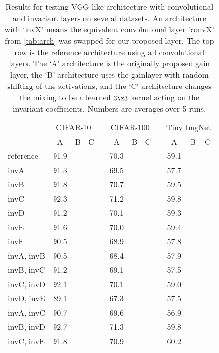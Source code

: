 \begin{table}
  \renewcommand{\arraystretch}{1.2}
  \centering
  \caption{Results for testing VGG like architecture with convolutional and
  invariant layers on several datasets. An architecture with `invX' means the
  equivalent convolutional layer `convX' from \autoref{tab:arch} was swapped for
  our proposed layer. The top row is the reference architecture using all
  convolutional layers. The `A' architecture is the originally proposed gain
  layer, the `B' architecture uses the gainlayer with random shifting of the
  activations, and the `C' architecture changes the mixing to be a learned
  $3\x3$ kernel acting on the invariant coefficients. Numbers are averages over
  5 runs.}
  \begin{tabular}{@{}lccclccclccc@{}}
    \toprule
    & \multicolumn{3}{c}{CIFAR-10} & \phantom{abc} & \multicolumn{3}{c}{CIFAR-100} & \phantom{abc} & \multicolumn{3}{c}{Tiny ImgNet} \\ \cline{2-4}\cline{6-8}\cline{10-12}
    \phantom{abc} & A  & B & C &&  A & B & C && A & B & C \\ \midrule
    reference & 91.9 & - & - && 70.3 & - & - && 59.1 & - & - \\ \midrule
    invA & 91.3 & & && 69.5 & & && 57.7 & &  \\
    invB & 91.8 & & && 70.7 & & && 59.5 & &  \\
    invC & 92.3 & & && 71.2 & & && 59.8 & &  \\
    invD & 91.2 & & && 70.1 & & && 59.3 & &  \\
    invE & 91.6 & & && 70.0 & & && 59.4 & &  \\
    invF & 90.5 & & && 68.9 & & && 57.8 & &  \\
    invA, invB& 90.5 & &  && 68.4 & &  && 57.9 & & \\
    invB, invC& 91.2 & & && 69.1 & & && 57.5 & & \\
    invC, invD& 92.1 & & && 70.1 & &  && 59.0 & & \\
    invD, invE& 89.1 & & && 67.3 & &  && 57.5 & & \\
    invA, invC& 90.7 & & && 69.6 & &  && 56.9 & & \\
    invB, invD& 92.7 & & && 71.3 & &  && 59.8 & & \\
    invC, invE& 91.8 & & && 70.9 & &  && 60.2 & & \\ \bottomrule
  \end{tabular}\label{tab:conv_results}
\end{table}

